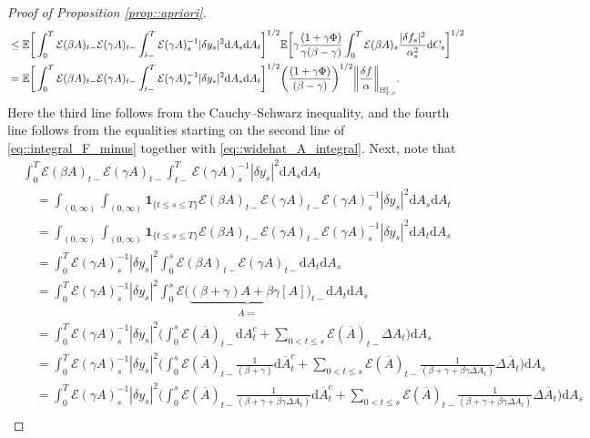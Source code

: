 \documentclass[10pt]{article} %
\newcommand\cE{\mathcal E}
\newcommand{\smalltext}[1]{\text{\fontsize{4}{4}\selectfont$#1$}}
\def \E{\mathbb{E}}
\def \H{\mathbb{H}}
\newcommand{\1}{\mathbf{1}}
\def\d{\mathrm{d}}
\begin{document}
\begin{proof}[Proof of Proposition \ref{prop::apriori}]
\begin{align}
	& \leq \E\bigg[ \int_0^T \cE(\beta A)_{t-}\cE(\gamma A)_{t-}\int_{t-}^T \cE(\gamma A)^{-1}_s |\delta y_s|^2 \d A_s \d A_t \bigg]^{1/2} \E\bigg[\gamma \frac{(1+\gamma\Phi)}{\gamma(\beta-\gamma)} \int_0^T \cE(\beta A)_s \frac{|\delta f_s|^2}{\alpha^2_s}\d C_s\bigg]^{1/2} \nonumber\\
	& = \E\bigg[ \int_0^T \cE(\beta A)_{t-}\cE(\gamma A)_{t-}\int_{t-}^T \cE(\gamma A)^{-1}_s |\delta y_s|^2 \d A_s \d A_t \bigg]^{1/2} \bigg(\frac{(1+\gamma\Phi)}{(\beta-\gamma)}\bigg)^{1/2} \bigg\|\frac{\delta f}{\alpha} \bigg\|_{\H^\smalltext{2}_{\smalltext{T}\smalltext{,}\smalltext{\beta}}}.
\end{align}
Here the third line follows from the Cauchy--Schwarz inequality, and the fourth line follows from the equalities starting on the second line of \eqref{eq::integral_F_minus} together with \eqref{eq::widehat_A_integral}. Next, note that
\begin{align}\label{eq7}
	&\int_0^T \cE(\beta A)_{t-}\cE(\gamma A)_{t-}\int_{t-}^T \cE(\gamma A)^{-1}_s |\delta y_s|^2 \d A_s \d A_t \nonumber\\
	&\quad = \int_{(0,\infty)}\int_{(0,\infty)} \mathbf{1}_{\{t \leq s \leq T\}} \cE(\beta A)_{t-}\cE(\gamma A)_{t-} \cE(\gamma A)^{-1}_s |\delta y_s|^2 \d A_s \d A_t \nonumber\\
	&\quad = \int_{(0,\infty)}\int_{(0,\infty)} \mathbf{1}_{\{t \leq s \leq T\}} \cE(\beta A)_{t-}\cE(\gamma A)_{t-} \cE(\gamma A)^{-1}_s |\delta y_s|^2 \d A_t \d A_s \nonumber\\
	&\quad = \int_0^T \cE(\gamma A)^{-1}_s |\delta y_s|^2 \int_0^s \cE(\beta A)_{t-}\cE(\gamma A)_{t-} \d A_t \d A_s \nonumber\\
	&\quad = \int_0^T \cE(\gamma A)^{-1}_s |\delta y_s|^2 \int_0^s \cE\big(\underbrace{(\beta+\gamma) A + \beta\gamma[A]}_{\displaystyle\overline A \coloneqq}\big)_{t-} \d A_t \d A_s \nonumber\\
	&\quad = \int_0^T \cE(\gamma A)^{-1}_s |\delta y_s|^2 \bigg( \int_0^s \cE(\overline A)_{t-} \d A^c_t + \sum_{0 < t \leq s} \cE(\overline A)_{t-} \Delta A_t \bigg) \d A_s \nonumber\\
	&\quad = \int_0^T \cE(\gamma A)^{-1}_s |\delta y_s|^2 \bigg( \int_0^s \cE(\overline A)_{t-} \frac{1}{(\beta + \gamma)} \d\overline A^c_t + \sum_{0 < t \leq s} \cE(\overline A)_{t-} \frac{1}{(\beta + \gamma + \beta\gamma\Delta A_t)} \Delta \overline A_t \bigg) \d A_s \nonumber\\
	&\quad = \int_0^T \cE(\gamma A)^{-1}_s |\delta y_s|^2 \bigg( \int_0^s \cE(\overline A)_{t-} \frac{1}{(\beta + \gamma + \beta\gamma\Delta A_t)} \d\overline A^c_t + \sum_{0 < t \leq s} \cE(\overline A)_{t-} \frac{1}{(\beta + \gamma + \beta\gamma\Delta A_t)} \Delta \overline A_t \bigg) \d A_s \nonumber\\

\end{align}
\end{proof}
\end{document}
